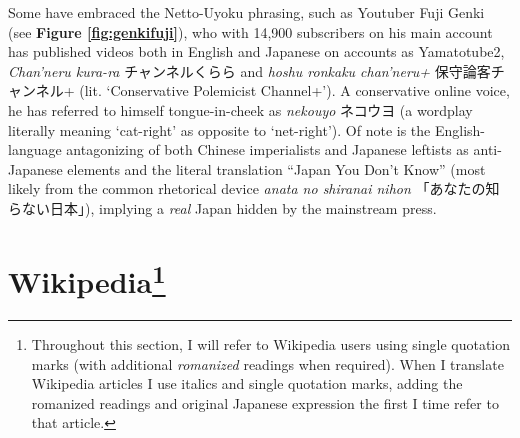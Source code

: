 \documentclass[10pt,british,A4paper,,openany]{memoir}
\begin{document}
Some have embraced the Netto-Uyoku phrasing, such as Youtuber Fuji Genki
(see \textbf{Figure \ref{fig:genkifuji}}), who with 14,900 subscribers
on his main account has published videos both in English and Japanese on
accounts as Yamatotube2, \emph{Chan'neru kura-ra} チャンネルくらら and
\emph{hoshu ronkaku chan'neru+} 保守論客チャンネル+ (lit. `Conservative
Polemicist Channel+'). A conservative online voice, he has referred to
himself tongue-in-cheek as \emph{nekouyo} ネコウヨ (a wordplay literally
meaning `cat-right' as opposite to `net-right'). Of note is the
English-language antagonizing of both Chinese imperialists and Japanese
leftists as anti-Japanese elements and the literal translation ``Japan
You Don't Know'' (most likely from the common rhetorical device
\emph{anata no shiranai nihon} 「あなたの知らない日本」), implying a
\emph{real} Japan hidden by the mainstream press.

\section[Wikipedia]{\texorpdfstring{Wikipedia\footnote{Throughout this
  section, I will refer to Wikipedia users using single quotation marks
  (with additional \emph{romanized} readings when required). When I
  translate Wikipedia articles I use italics and single quotation marks,
  adding the romanized readings and original Japanese expression the
  first I time refer to that article.}}{Wikipedia}}\label{wikipedia76}
\end{document}
